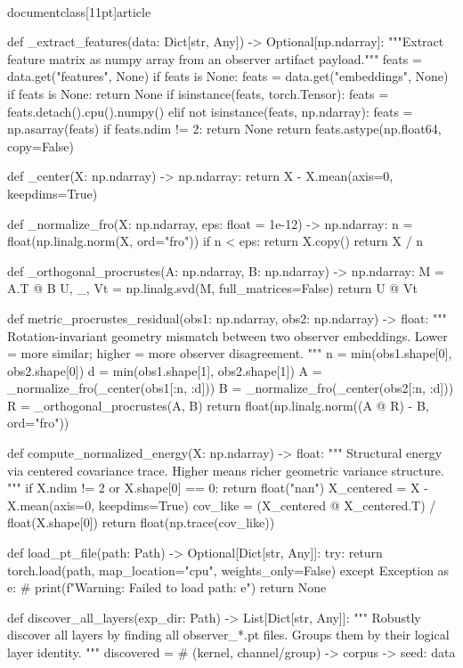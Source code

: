 \\documentclass[11pt]{article}
\begin{document}
\begin{CodeBlock}
def _extract_features(data: Dict[str, Any]) -> Optional[np.ndarray]:
    """Extract feature matrix as numpy array from an observer artifact payload."""
    feats = data.get("features", None)
    if feats is None:
        feats = data.get("embeddings", None)
    if feats is None:
        return None
    if isinstance(feats, torch.Tensor):
        feats = feats.detach().cpu().numpy()
    elif not isinstance(feats, np.ndarray):
        feats = np.asarray(feats)
    if feats.ndim != 2:
        return None
    return feats.astype(np.float64, copy=False)


def _center(X: np.ndarray) -> np.ndarray:
    return X - X.mean(axis=0, keepdims=True)


def _normalize_fro(X: np.ndarray, eps: float = 1e-12) -> np.ndarray:
    n = float(np.linalg.norm(X, ord="fro"))
    if n < eps:
        return X.copy()
    return X / n


def _orthogonal_procrustes(A: np.ndarray, B: np.ndarray) -> np.ndarray:
    M = A.T @ B
    U, _, Vt = np.linalg.svd(M, full_matrices=False)
    return U @ Vt


def metric_procrustes_residual(obs1: np.ndarray, obs2: np.ndarray) -> float:
    """
    Rotation-invariant geometry mismatch between two observer embeddings.
    Lower = more similar; higher = more observer disagreement.
    """
    n = min(obs1.shape[0], obs2.shape[0])
    d = min(obs1.shape[1], obs2.shape[1])
    A = _normalize_fro(_center(obs1[:n, :d]))
    B = _normalize_fro(_center(obs2[:n, :d]))
    R = _orthogonal_procrustes(A, B)
    return float(np.linalg.norm((A @ R) - B, ord="fro"))


def compute_normalized_energy(X: np.ndarray) -> float:
    """
    Structural energy via centered covariance trace.
    Higher means richer geometric variance structure.
    """
    if X.ndim != 2 or X.shape[0] == 0:
        return float("nan")
    X_centered = X - X.mean(axis=0, keepdims=True)
    cov_like = (X_centered @ X_centered.T) / float(X.shape[0])
    return float(np.trace(cov_like))

def load_pt_file(path: Path) -> Optional[Dict[str, Any]]:
    try:
        return torch.load(path, map_location="cpu", weights_only=False)
    except Exception as e:
        # print(f"Warning: Failed to load {path}: {e}")
        return None

def discover_all_layers(exp_dir: Path) -> List[Dict[str, Any]]:
    """
    Robustly discover all layers by finding all observer_*.pt files.
    Groups them by their logical layer identity.
    """
    discovered = {} # (kernel, channel/group) -> {corpus -> {seed: data}}
    

\end{CodeBlock}
\end{document}
